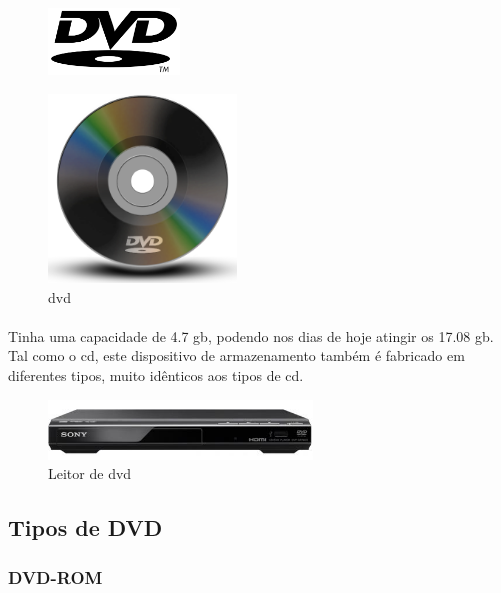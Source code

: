 \documentclass[a4paper]{report}
\begin{document}
\begin{figure}[H]
\center
\includegraphics[width=3.5cm]{Imagens/dvd_logo.png}
\end{figure}

\begin{figure}[H]
\center
\includegraphics[width=5cm]{Imagens/dvd.png}
\caption{\ac{dvd}}
\end{figure}

\paragraph*{}Tinha uma capacidade de 4.7 \ac{gb}, podendo nos dias de hoje atingir os 17.08 \ac{gb}. Tal como o \ac{cd}, este dispositivo de armazenamento também é fabricado em diferentes tipos, muito idênticos aos tipos de \ac{cd}.

\begin{figure}[H]
\center
\includegraphics[width=7cm]{Imagens/leitor_dvd.jpg}
\caption{Leitor de \ac{dvd}}
\end{figure}

\vspace*{5mm}

\subsection{Tipos de DVD}

\vspace*{8mm}

\subsubsection{DVD-ROM} 
\end{document}
